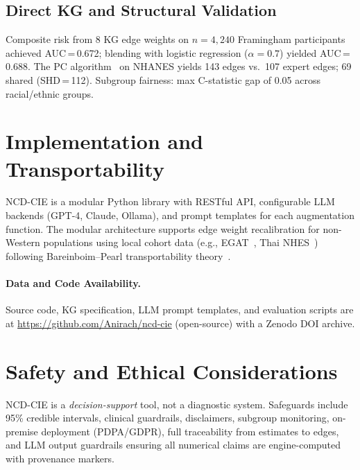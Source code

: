 \documentclass[runningheads]{llncs}
\begin{document}
\subsection{Direct KG and Structural Validation}\label{sec:directkg}

Composite risk from 8 KG edge weights on $n = 4{,}240$
Framingham participants achieved AUC\,=\,0.672; blending with
logistic regression ($\alpha\!=\!0.7$) yielded AUC\,=\,0.688.
The PC algorithm~\cite{spirtes2000causation} on NHANES yields
143 edges vs.\ 107 expert edges; 69 shared (SHD\,=\,112).
Subgroup fairness: max C-statistic gap of 0.05 across
racial/ethnic groups.

\section{Implementation and Transportability}\label{sec:impl}

NCD-CIE is a modular Python library with RESTful API, configurable
LLM backends (GPT-4, Claude, Ollama), and prompt templates for each
augmentation function.
The modular architecture supports edge weight recalibration for
non-Western populations using local cohort data (e.g.,
EGAT~\cite{sritara2003egat}, Thai NHES~\cite{aekplakorn2011thai})
following Bareinboim--Pearl transportability
theory~\cite{bareinboim2016causal}.

\paragraph{Data and Code Availability.}
Source code, KG specification, LLM prompt templates, and evaluation
scripts are at
\url{https://github.com/Anirach/ncd-cie} (open-source) with a
Zenodo DOI archive.

\section{Safety and Ethical Considerations}\label{sec:ethics}

NCD-CIE is a \emph{decision-support} tool, not a diagnostic system.
Safeguards include 95\% credible intervals, clinical guardrails,
disclaimers, subgroup monitoring, on-premise deployment
(PDPA/GDPR), full traceability from estimates to edges, and
LLM output guardrails ensuring all numerical claims are
engine-computed with provenance markers.

\end{document}
